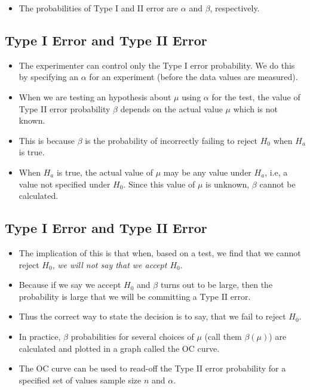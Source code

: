 \documentclass[
  letterpaper,
  DIV=11,
  numbers=noendperiod]{scrartcl}
\providecommand{\tightlist}{%
  \setlength{\itemsep}{0pt}\setlength{\parskip}{0pt}}\usepackage{longtable,booktabs,array}
\begin{document}
\begin{itemize}
\tightlist
\item
  The probabilities of Type I and II error are \(\alpha\) and \(\beta\),
  respectively.
\end{itemize}

\subsection{Type I Error and Type II
Error}\label{type-i-error-and-type-ii-error}

\begin{itemize}
\item
  The experimenter can control only the Type I error probability. We do
  this by specifying an \(\alpha\) for an experiment (before the data
  values are measured).
\item
  When we are testing an hypothesis about \(\mu\) using \(\alpha\) for
  the test, the value of {Type II error probability \(\beta\)} depends
  on the actual value \(\mu\) which is not known.
\item
  This is because \(\beta\) is the {probability of incorrectly failing
  to reject \(H_0\) when \(H_a\) is true}.
\item
  When \(H_a\) is true, the actual value of \(\mu\) may be any value
  under \(H_a\), i.e, a value not specified under \(H_0\). Since this
  value of \(\mu\) is unknown, \(\beta\) cannot be calculated.
\end{itemize}

\subsection{Type I Error and Type II
Error}\label{type-i-error-and-type-ii-error-1}

\begin{itemize}
\item
  The implication of this is that when, based on a test, we find that we
  cannot reject \(H_0\), \emph{we will not say that we accept \(H_0\)}.
\item
  Because if we say we accept \(H_0\) and \(\beta\) turns out to be
  large, then the probability is large that we will be committing a Type
  II error.
\item
  Thus the correct way to state the decision is to say, that {we fail to
  reject \(H_0\)}.
\item
  In practice, \(\beta\) probabilities for several choices of \(\mu\)
  (call them \(\beta(\mu)\)) are calculated and plotted in a graph
  called the {OC curve}.
\item
  The OC curve can be used to read-off the {Type II error probability}
  for a specified set of values sample size \(n\) and \(\alpha\).
\end{itemize}
\end{document}
